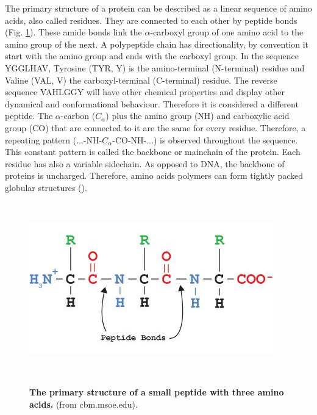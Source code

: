 The primary structure of a protein can be described as a linear sequence of amino acids, also called residues.
They are connected to each other by peptide bonds (Fig. \ref{fig:primary_structure}).
These amide bonds link the $\alpha$-carboxyl group of one amino acid to the amino group of the next.
A polypeptide chain has directionality, 
by convention it start with the amino group and ends with the carboxyl group. 
In the sequence YGGLHAV, Tyrosine (TYR, Y) is the amino-terminal (N-terminal) residue and Valine (VAL, V) the carboxyl-terminal (C-terminal) residue.
The reverse sequence VAHLGGY will have other chemical properties and display other dynamical and conformational behaviour.
Therefore it is considered a different peptide.
The $\alpha$-carbon ($C_{\alpha}$) plus the amino group (NH) and carboxylic acid group (CO) that are connected to it are the same for every residue.
Therefore, a repeating pattern (...-NH-$C_{\alpha}$-CO-NH-...) is observed throughout the sequence.
This constant pattern is called the backbone or mainchain of the protein.
Each residue has also a variable sidechain.
As opposed to DNA,
the backbone of proteins is uncharged.
Therefore, amino acids polymers can form tightly packed globular structures
(\cite{berg2015}).

~\begin{figure}[h!]
	\centering
	\includegraphics[height=0.25\textheight]{./literature_review/proteins/primary_structure/img/primary_structure.jpg}
	\caption{
		\textbf{The primary structure of a small peptide with three amino acids.}
	(from cbm.msoe.edu).
	}
	\label{fig:primary_structure}
~\end{figure}
